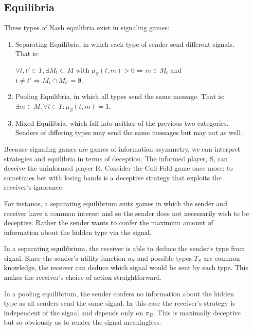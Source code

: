 \documentclass{article}
\begin{document}
\subsection{Equilibria}

Three types of Nash equilibria exist in signaling games:

\begin{enumerate}
\item Separating Equilibria, in which each type of sender send different signals. That is:

$\forall t, t' \in T, \exists M_{t} \subset M$ with $\mu_S(t,m) > 0 \Rightarrow m \in M_{t}$ and $t \ne t' \Rightarrow M_{t} \cap M_{t'} = \emptyset$.

\item Pooling Equilibria, in which all types send the same message. That is: $\exists  m \in M, \forall t \in T : \mu_S(t,m) = 1$.

\item Mixed Equilibria, which fall into neither of the previous two categories. Senders of differing types may send the same messages but may not as well. 
\end{enumerate}

Because signaling games are games of information asymmetry, we can interpret strategies and equilibria in terms of deception. The informed player, S, can deceive the uninformed player R. Consider the Call-Fold game once more: to sometimes bet with losing hands is a deceptive strategy that exploits the receiver's ignorance. 

 For instance, a separating equilibrium suits games in which the sender and receiver have a common interest and so the sender does not necessarily wish to be deceptive. Rather the sender wants to confer the maximum amount of information about the hidden type via the signal.

In a separating equilibrium, the receiver is able to deduce the sender's type from signal. Since the sender's utility function $u_{S}$ and possible types $T_S$ are common knowledge, the receiver can deduce which signal would be sent by each type. This makes the receiver's choice of action straightforward.

In a pooling equilibrium, the sender confers no information about the hidden type as all senders send the same signal. In this case the receiver's strategy is independent of the signal and depends only on $\pi_{ R}$. This is maximally deceptive but so obviously as to render the signal meaningless.
\end{document}
